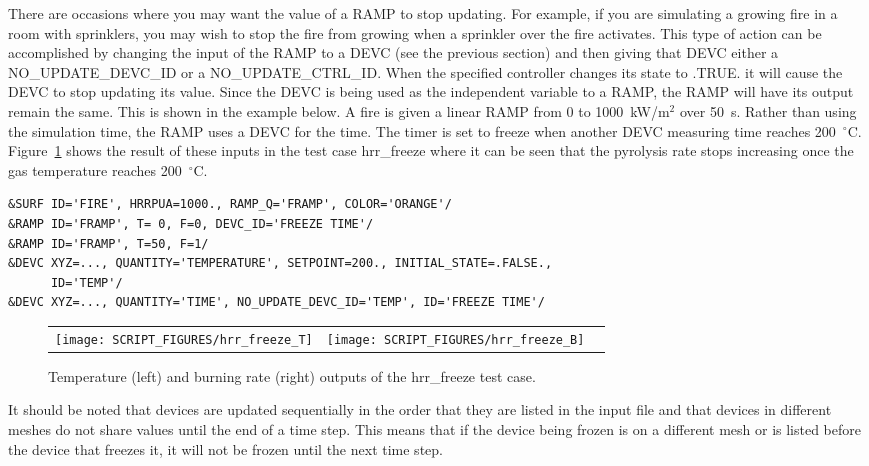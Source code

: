 \documentclass[11pt]{book}
\begin{document}
There are occasions where you may want the value of a {\ct RAMP} to stop updating.  For example, if you are simulating a growing fire in a room with sprinklers, you may wish to stop the fire from growing when a sprinkler over the fire activates.  This type of action can be accomplished by changing the input of the {\ct RAMP} to a {\ct DEVC} (see the previous section) and then giving that {\ct DEVC} either a {\ct NO\_UPDATE\_DEVC\_ID} or a {\ct NO\_UPDATE\_CTRL\_ID}.  When the specified controller changes its state to {\ct .TRUE.} it will cause the {\ct DEVC} to stop updating its value.  Since the {\ct DEVC} is being used as the independent variable to a {\ct RAMP}, the {\ct RAMP} will have its output remain the same.  This is shown in the example below.  A fire is given a linear {\ct RAMP} from 0 to 1000~kW/m$^2$ over 50~s. Rather than using the simulation time, the {\ct RAMP} uses a {\ct DEVC} for the time.  The timer is set to freeze when another {\ct DEVC} measuring time reaches 200~$^\circ$C.  Figure~\ref{freeze_hrr} shows the result of these inputs in the test case {\ct hrr\_freeze} where it can be seen that the pyrolysis rate stops increasing once the gas temperature reaches 200~$^\circ$C.
\begin{lstlisting}
&SURF ID='FIRE', HRRPUA=1000., RAMP_Q='FRAMP', COLOR='ORANGE'/
&RAMP ID='FRAMP', T= 0, F=0, DEVC_ID='FREEZE TIME'/
&RAMP ID='FRAMP', T=50, F=1/
&DEVC XYZ=..., QUANTITY='TEMPERATURE', SETPOINT=200., INITIAL_STATE=.FALSE.,
      ID='TEMP'/
&DEVC XYZ=..., QUANTITY='TIME', NO_UPDATE_DEVC_ID='TEMP', ID='FREEZE TIME'/
\end{lstlisting}

\begin{figure}[ht]
\begin{tabular*}{\textwidth}{lll}
\texttt{[image: SCRIPT\_FIGURES/hrr\_freeze\_T]} &
\texttt{[image: SCRIPT\_FIGURES/hrr\_freeze\_B]} &
\end{tabular*}
\caption[Example of freezing the output of a {\ct RAMP}]{Temperature (left) and burning rate (right) outputs of the {\ct hrr\_freeze} test case.}
\label{freeze_hrr}
\end{figure}

It should be noted that devices are updated sequentially in the order that they are listed in the input file and that devices in different meshes do not share values until the end of a time step.  This means that if the device being frozen is on a different mesh or is listed before the device that freezes it, it will not be frozen until the next time step.
\end{document}
